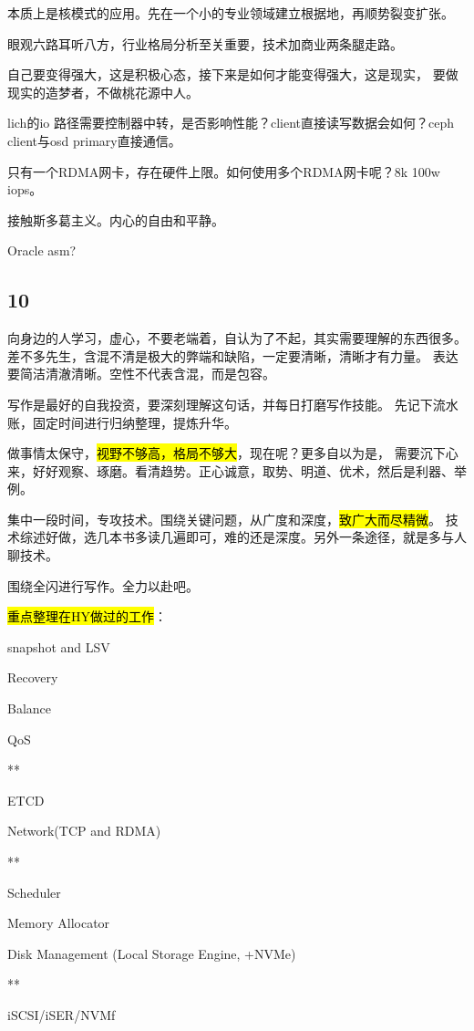 本质上是核模式的应用。先在一个小的专业领域建立根据地，再顺势裂变扩张。

眼观六路耳听八方，行业格局分析至关重要，技术加商业两条腿走路。

自己要变得强大，这是积极心态，接下来是如何才能变得强大，这是现实，
要做现实的造梦者，不做桃花源中人。

lich的io 路径需要控制器中转，是否影响性能？client直接读写数据会如何？ceph client与osd primary直接通信。

只有一个RDMA网卡，存在硬件上限。如何使用多个RDMA网卡呢？8k 100w iops。

接触斯多葛主义。内心的自由和平静。

Oracle asm?

\subsection{10}

向身边的人学习，虚心，不要老端着，自认为了不起，其实需要理解的东西很多。
差不多先生，含混不清是极大的弊端和缺陷，一定要清晰，清晰才有力量。
表达要简洁清澈清晰。空性不代表含混，而是包容。

写作是最好的自我投资，要深刻理解这句话，并每日打磨写作技能。
先记下流水账，固定时间进行归纳整理，提炼升华。

做事情太保守，\hl{视野不够高，格局不够大}，现在呢？更多自以为是，
需要沉下心来，好好观察、琢磨。看清趋势。正心诚意，取势、明道、优术，然后是利器、举例。

集中一段时间，专攻技术。围绕关键问题，从广度和深度，\hl{致广大而尽精微}。
技术综述好做，选几本书多读几遍即可，难的还是深度。另外一条途径，就是多与人聊技术。

围绕全闪进行写作。全力以赴吧。

\hrulefill

\hl{重点整理在HY做过的工作}：
\begin{enumbox}
\item snapshot and LSV
\item Recovery
\item Balance
\item QoS
\item ***
\item ETCD
\item Network(TCP and RDMA)
\item ***
\item Scheduler
\item Memory Allocator
\item Disk Management (Local Storage Engine, +NVMe)
\item ***
\item iSCSI/iSER/NVMf
\end{enumbox}

